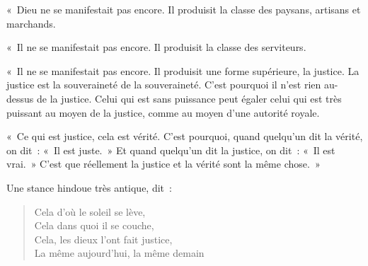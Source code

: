 \documentclass[french,twoside]{book} %
\begin{document}
« Dieu ne se manifestait pas encore. Il produisit la classe des paysans, artisans et marchands.\par
« Il ne se manifestait pas encore. Il produisit la classe des serviteurs.\par
« Il ne se manifestait pas encore. Il produisit une forme supérieure, la justice. La justice est la souveraineté de la souveraineté. C'est pourquoi il n'est rien au-dessus de la justice. Celui qui est sans puissance peut égaler celui qui est très puissant au moyen de la justice, comme au moyen d'une autorité royale.\par
« Ce qui est justice, cela est vérité. C'est pourquoi, quand quelqu'un dit la vérité, on dit : « Il est juste. » Et quand quelqu'un dit la justice, on dit : « Il est vrai. » C'est que réellement la justice et la vérité sont la même chose. »\par
Une stance hindoue très antique, dit :\par


\begin{verse}
Cela d'où le soleil se lève,\\
Cela dans quoi il se couche,\\
Cela, les dieux l'ont fait justice,\\
La même aujourd'hui, la même demain\\
\end{verse}
\end{document}
